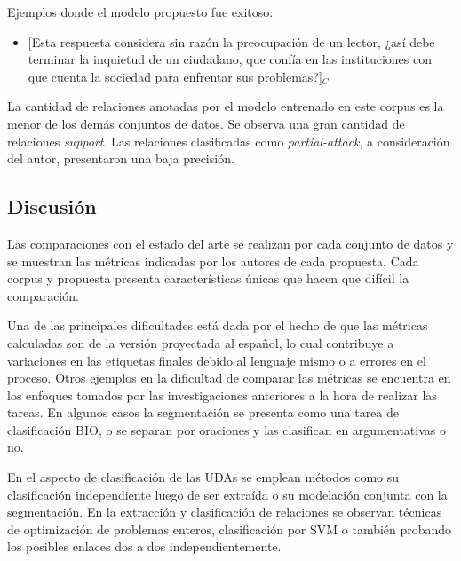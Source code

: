 \documentclass{rcci} %
\begin{document}
Ejemplos donde el modelo propuesto fue exitoso:
\begin{itemize}
	\item \text{} [Esta respuesta considera sin raz\'on la preocupaci\'on de un lector,
		      ¿as\'i debe terminar la inquietud de un ciudadano, que conf\'ia en las instituciones con que cuenta la 
		      sociedad para enfrentar sus problemas?]$_C$ %
\end{itemize}

La cantidad de relaciones anotadas por el modelo entrenado en este corpus es la menor
de los dem\'as conjuntos de datos. Se observa una gran cantidad de relaciones \textit{support}. %
Las relaciones clasificadas como \textit{partial-attack}, a consideraci\'on del autor, presentaron 
una baja precisi\'on.

\subsection*{Discusi\'on}

Las comparaciones con el estado del arte se realizan por cada conjunto de datos y se muestran las 
m\'etricas indicadas por los autores de cada propuesta. Cada corpus y propuesta 
presenta caracter\'isticas \'unicas que hacen que dif\'icil la comparaci\'on. 

Una de las principales dificultades est\'a dada por el hecho de que las m\'etricas calculadas son de la versi\'on proyectada
al espa\~nol, lo cual contribuye a variaciones en las etiquetas finales debido al lenguaje mismo 
o a errores en el proceso. Otros ejemplos en la dificultad de comparar las m\'etricas se encuentra
en los enfoques tomados por las investigaciones anteriores a la hora de realizar las tareas.
En algunos casos la segmentaci\'on se presenta como una tarea de clasificaci\'on BIO, o
se separan por oraciones y las clasifican en argumentativas o no.

En el aspecto de clasificaci\'on
de las UDAs se emplean m\'etodos como su clasificaci\'on independiente luego de ser extra\'ida o su modelaci\'on
conjunta con la segmentaci\'on. En la extracci\'on y clasificaci\'on de relaciones se observan t\'ecnicas de 
optimizaci\'on de problemas enteros, clasificaci\'on por SVM o tambi\'en probando los posibles enlaces dos 
a dos independientemente.
\end{document}
